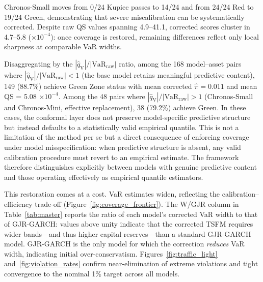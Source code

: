 \documentclass[preprint,11pt,authoryear]{elsarticle}
\newcommand{\VaR}{\mathrm{VaR}}
\newcommand{\1}{\boldsymbol{1}}
\newcommand{\qV}{\hat{q}_{\scriptscriptstyle\mathrm{V}}}
\begin{document}
	Chronos-Small moves from 0/24 Kupiec passes to 14/24 and from
	24/24 Red to 19/24 Green, demonstrating that severe
	miscalibration can be systematically corrected. Despite raw QS
	values spanning 4.9--41.1, corrected scores cluster in
	4.7--5.8 ($\times 10^{-4}$): once coverage is restored,
	remaining differences reflect only local sharpness at
	comparable VaR widths.
	
	Disaggregating by the $|\qV|/|\VaR_{\mathrm{raw}}|$
	ratio, among the 168 model--asset pairs where
	$|\qV|/|\VaR_{\mathrm{raw}}| < 1$ (the base model retains
	meaningful predictive content), 149 (88.7\%) achieve Green Zone
	status with mean corrected $\hat\pi = 0.011$ and mean
	QS = 5.08 $\times 10^{-4}$. Among the 48 pairs where
	$|\qV|/|\VaR_{\mathrm{raw}}| > 1$ (Chronos-Small and
	Chronos-Mini, effective replacement), 38 (79.2\%) achieve Green.
	In these cases, the conformal layer does not preserve model-specific predictive structure but instead defaults to a statistically valid empirical quantile. This is not a limitation of the method per se but a direct consequence of enforcing coverage under model misspecification: when predictive structure is absent, any valid calibration procedure must revert to an empirical estimate.
	The framework therefore distinguishes explicitly between models with genuine predictive content and those operating effectively as empirical quantile estimators.

	This restoration comes at a cost. VaR estimates widen, reflecting
	the calibration--efficiency trade-off
	(Figure~\ref{fig:coverage_frontier}). The W/GJR column in
	Table~\ref{tab:master} reports the ratio of each model's
	corrected VaR width to that of GJR-GARCH: values above unity
	indicate that the corrected TSFM requires wider bands---and
	thus higher capital reserves---than a standard GJR-GARCH model.
	GJR-GARCH is the only model for which the correction
	\emph{reduces} VaR width, indicating initial over-conservatism.
	Figures~\ref{fig:traffic_light} and~\ref{fig:violation_rates}
	confirm near-elimination of extreme violations and tight
	convergence to the nominal 1\% target across all models.
	
\end{document}
